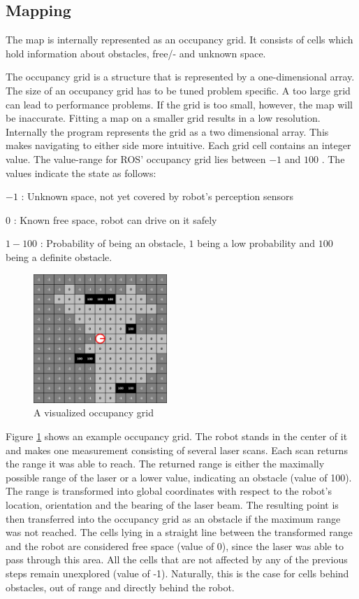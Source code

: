 \documentclass{ba-kecs}
\begin{document}
\subsection{Mapping}
\label{sec:mapping}
The map is internally represented as an occupancy grid. It consists of cells which hold information about obstacles, free/- and unknown space. 

The occupancy grid is a structure that is represented by a one-dimensional array. The size of an occupancy grid has to be tuned problem specific. A too large grid can lead to performance problems. If the grid is too small, however, the map will be inaccurate. Fitting a map on a smaller grid results in a low resolution.
Internally the program represents the grid as a two dimensional array. This makes navigating to either side more intuitive. Each grid cell contains an integer value. The value-range for ROS' occupancy grid lies between $-1$ and $100$ \cite{occupancy}. The values indicate the state as follows:
\begin{description}
\item{$-1$} : Unknown space, not yet covered by robot's perception sensors
\item{$0$} : Known free space, robot can drive on it safely
\item{$1-100$} : Probability of being an obstacle, $1$ being a low probability and $100$ being a definite obstacle.
\end{description}
\begin{figure}[htbp]
	\centering
		\includegraphics[width=0.45\textwidth]{figures/Occup.png}
	\caption{A visualized occupancy grid}
	\label{fig:Occupancy}
\end{figure}
Figure \ref{fig:Occupancy} shows an example occupancy grid. The robot stands in the center of it and makes one measurement consisting of several laser scans. Each scan returns the range it was able to reach. The returned range is either the maximally possible range of the laser or a lower value, indicating an obstacle (value of 100). The range is transformed into global coordinates with respect to the robot's location, orientation and the bearing of the laser beam. The resulting point is then transferred into the occupancy grid as an obstacle if the maximum range was not reached. The cells lying in a straight line between the transformed range and the robot are considered free space (value of 0), since the laser was able to pass through this area. All the cells that are not affected by any of the previous steps remain unexplored (value of -1). Naturally, this is the case for cells behind obstacles, out of range and directly behind the robot.
\end{document}
